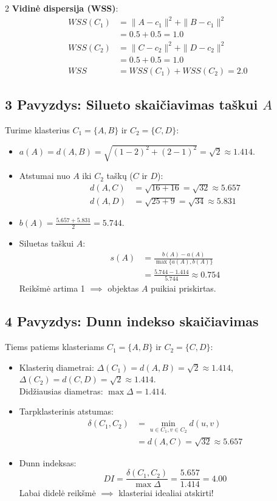 \documentclass[9pt,a4paper]{article}
\begin{document}
\begin{multicols*}{2}
\textbf{Vidinė dispersija (WSS)}:
\begin{align*}
    WSS(C_1) &= \|A - c_1\|^2 + \|B - c_1\|^2 \\
    &= 0.5 + 0.5 = 1.0 \\
    WSS(C_2) &= \|C - c_2\|^2 + \|D - c_2\|^2 \\
    &= 0.5 + 0.5 = 1.0 \\
    WSS &= WSS(C_1) + WSS(C_2) = 2.0
\end{align*}

\subsection{3 Pavyzdys: Silueto skaičiavimas taškui $A$}
Turime klasterius $C_1 = \{A, B\}$ ir $C_2 = \{C, D\}$:
\begin{itemize}
    \item $a(A) = d(A, B) = \sqrt{(1-2)^2 + (2-1)^2} = \sqrt{2} \approx 1.414$.
    \item Atstumai nuo $A$ iki $C_2$ taškų ($C$ ir $D$):
    \begin{align*}
        d(A, C) &= \sqrt{16 + 16} = \sqrt{32} \approx 5.657 \\
        d(A, D) &= \sqrt{25 + 9} = \sqrt{34} \approx 5.831
    \end{align*}
    \item $b(A) = \frac{5.657 + 5.831}{2} = 5.744$.
    \item Siluetas taškui $A$:
    \begin{align*}
        s(A) &= \frac{b(A) - a(A)}{\max\{a(A), b(A)\}} \\
        &= \frac{5.744 - 1.414}{5.744} \approx 0.754
    \end{align*}
    Reikšmė artima 1 $\implies$ objektas $A$ puikiai priskirtas.
\end{itemize}

\subsection{4 Pavyzdys: Dunn indekso skaičiavimas}
Tiems patiems klasteriams $C_1=\{A, B\}$ ir $C_2=\{C, D\}$:
\begin{itemize}
    \item Klasterių diametrai:
    $\Delta(C_1) = d(A, B) = \sqrt{2} \approx 1.414$,\\
    $\Delta(C_2) = d(C, D) = \sqrt{2} \approx 1.414$.\\
    Didžiausias diametras: $\max \Delta = 1.414$.
    \item Tarpklasterinis atstumas:
    \begin{align*}
        \delta(C_1, C_2) &= \min_{u \in C_1, v \in C_2} d(u, v) \\
        &= d(A, C) = \sqrt{32} \approx 5.657
    \end{align*}
    \item Dunn indeksas:
    \begin{equation*}
        DI = \frac{\delta(C_1, C_2)}{\max \Delta} = \frac{5.657}{1.414} = 4.00
    \end{equation*}
    Labai didelė reikšmė $\implies$ klasteriai idealiai atskirti!
\end{itemize}


\end{multicols*}
\end{document}
